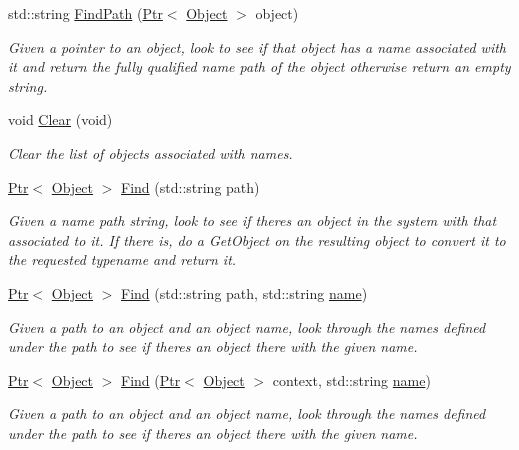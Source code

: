 \begin{DoxyCompactItemize}
std\+::string \hyperlink{classns3_1_1NamesPriv_a4a2421dd19968986051239ce2615485f}{Find\+Path} (\hyperlink{classns3_1_1Ptr}{Ptr}$<$ \hyperlink{classns3_1_1Object}{Object} $>$ object)
\begin{DoxyCompactList}\small\item\em Given a pointer to an object, look to see if that object has a name associated with it and return the fully qualified name path of the object otherwise return an empty string. \end{DoxyCompactList}\item 
void \hyperlink{classns3_1_1NamesPriv_a7830244fafff9d2221a830e9b247b57a}{Clear} (void)
\begin{DoxyCompactList}\small\item\em Clear the list of objects associated with names. \end{DoxyCompactList}\item 
\hyperlink{classns3_1_1Ptr}{Ptr}$<$ \hyperlink{classns3_1_1Object}{Object} $>$ \hyperlink{classns3_1_1NamesPriv_aeb1553e055f77ec72919f4ed41e4aec2}{Find} (std\+::string path)
\begin{DoxyCompactList}\small\item\em Given a name path string, look to see if there\textquotesingle{}s an object in the system with that associated to it. If there is, do a Get\+Object on the resulting object to convert it to the requested typename and return it. \end{DoxyCompactList}\item 
\hyperlink{classns3_1_1Ptr}{Ptr}$<$ \hyperlink{classns3_1_1Object}{Object} $>$ \hyperlink{classns3_1_1NamesPriv_a712dfaa8882f8148ebe40e6ebcb10f9f}{Find} (std\+::string path, std\+::string \hyperlink{generate__test__data__lte__spectrum__model_8m_ab74e6bf80237ddc4109968cedc58c151}{name})
\begin{DoxyCompactList}\small\item\em Given a path to an object and an object name, look through the names defined under the path to see if there\textquotesingle{}s an object there with the given name. \end{DoxyCompactList}\item 
\hyperlink{classns3_1_1Ptr}{Ptr}$<$ \hyperlink{classns3_1_1Object}{Object} $>$ \hyperlink{classns3_1_1NamesPriv_ad6e9e999c0ef8292819648ac7d0d438d}{Find} (\hyperlink{classns3_1_1Ptr}{Ptr}$<$ \hyperlink{classns3_1_1Object}{Object} $>$ context, std\+::string \hyperlink{generate__test__data__lte__spectrum__model_8m_ab74e6bf80237ddc4109968cedc58c151}{name})
\begin{DoxyCompactList}\small\item\em Given a path to an object and an object name, look through the names defined under the path to see if there\textquotesingle{}s an object there with the given name. \end{DoxyCompactList}\end{DoxyCompactItemize}
